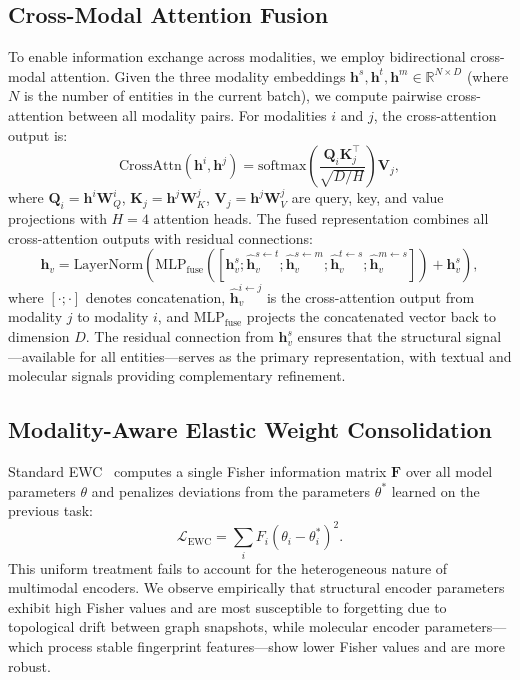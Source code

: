 \subsection{Cross-Modal Attention Fusion}
\label{subsec:fusion}

To enable information exchange across modalities, we employ bidirectional cross-modal attention.
Given the three modality embeddings $\mathbf{h}^s, \mathbf{h}^t, \mathbf{h}^m \in \mathbb{R}^{N \times D}$ (where $N$ is the number of entities in the current batch), we compute pairwise cross-attention between all modality pairs.
For modalities $i$ and $j$, the cross-attention output is:
\begin{equation}
    \text{CrossAttn}(\mathbf{h}^i, \mathbf{h}^j) = \text{softmax}\left(\frac{\mathbf{Q}_i \mathbf{K}_j^\top}{\sqrt{D/H}}\right) \mathbf{V}_j,
    \label{eq:crossattn}
\end{equation}
where $\mathbf{Q}_i = \mathbf{h}^i \mathbf{W}_Q^i$, $\mathbf{K}_j = \mathbf{h}^j \mathbf{W}_K^j$, $\mathbf{V}_j = \mathbf{h}^j \mathbf{W}_V^j$ are query, key, and value projections with $H{=}4$ attention heads.
The fused representation combines all cross-attention outputs with residual connections:
\begin{equation}
    \mathbf{h}_v = \text{LayerNorm}\left(\text{MLP}_{\text{fuse}}\left([\mathbf{h}_v^s; \hat{\mathbf{h}}_v^{s \leftarrow t}; \hat{\mathbf{h}}_v^{s \leftarrow m}; \hat{\mathbf{h}}_v^{t \leftarrow s}; \hat{\mathbf{h}}_v^{m \leftarrow s}]\right) + \mathbf{h}_v^s\right),
    \label{eq:fusion}
\end{equation}
where $[\cdot;\cdot]$ denotes concatenation, $\hat{\mathbf{h}}_v^{i \leftarrow j}$ is the cross-attention output from modality $j$ to modality $i$, and MLP$_{\text{fuse}}$ projects the concatenated vector back to dimension $D$.
The residual connection from $\mathbf{h}_v^s$ ensures that the structural signal---available for all entities---serves as the primary representation, with textual and molecular signals providing complementary refinement.

\subsection{Modality-Aware Elastic Weight Consolidation}
\label{subsec:maewc}

Standard EWC~\citep{kirkpatrick2017overcoming} computes a single Fisher information matrix $\mathbf{F}$ over all model parameters $\theta$ and penalizes deviations from the parameters $\theta^*$ learned on the previous task:
\begin{equation}
    \mathcal{L}_{\text{EWC}} = \sum_i F_i (\theta_i - \theta_i^*)^2.
    \label{eq:ewc_standard}
\end{equation}
This uniform treatment fails to account for the heterogeneous nature of multimodal encoders.
We observe empirically that structural encoder parameters exhibit high Fisher values and are most susceptible to forgetting due to topological drift between graph snapshots, while molecular encoder parameters---which process stable fingerprint features---show lower Fisher values and are more robust.


